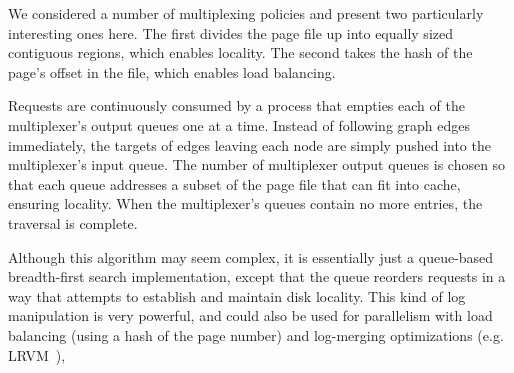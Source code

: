 \documentclass[10pt,letterpaper,twocolumn,english]{article}
\newcommand{\rcs}[1]{\textcolor{green}{\bf RCS: #1}}
\begin{document}
We considered a number of multiplexing policies and present two
particularly interesting ones here.  The first divides the page file
up into equally sized contiguous regions, which enables locality.  The second takes the hash
of the page's offset in the file, which enables load balancing.

Requests are continuously consumed by a process that empties each of
the multiplexer's output queues one at a time.  Instead of following
graph edges immediately, the targets of edges leaving each node are
simply pushed into the multiplexer's input queue.  The number of
multiplexer output queues is chosen so that each queue addresses a
subset of the page file that can fit into cache, ensuring locality.  When the
multiplexer's queues contain no more entries, the traversal is
complete.  

Although this algorithm may seem complex, it is essentially just a
queue-based breadth-first search implementation, except that the queue
reorders requests in a way that attempts to establish and maintain
disk locality.  This kind of log manipulation is very powerful, and
could also be used for parallelism with load balancing (using a hash
of the page number) and log-merging optimizations
(e.g. LRVM~\cite{LRVM}),



\end{document}

